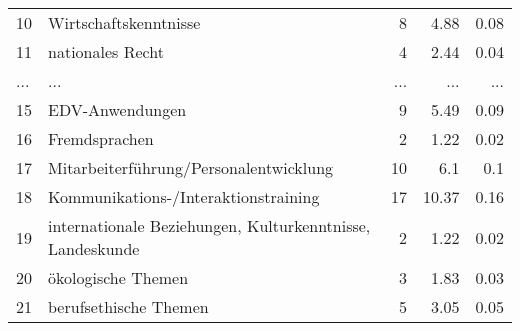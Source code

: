 \begin{longtable}{lXrrr}
        10 & \multicolumn{1}{X}{Wirtschaftskenntnisse} & %
          \num{8} &
          \num[round-mode=places,round-precision=2]{4,88} &
          \num[round-mode=places,round-precision=2]{0,08} \\
        11 & \multicolumn{1}{X}{nationales Recht} & %
          \num{4} &
          \num[round-mode=places,round-precision=2]{2,44} &
          \num[round-mode=places,round-precision=2]{0,04} \\
       ... & ... & ... & ... & ... \\
        15 & \multicolumn{1}{X}{EDV-Anwendungen} & %
          \num{9} &
          \num[round-mode=places,round-precision=2]{5,49} &
          \num[round-mode=places,round-precision=2]{0,09} \\

        16 & \multicolumn{1}{X}{Fremdsprachen} & %
          \num{2} &
          \num[round-mode=places,round-precision=2]{1,22} &
          \num[round-mode=places,round-precision=2]{0,02} \\

        17 & \multicolumn{1}{X}{Mitarbeiterführung/Personalentwicklung} & %
          \num{10} &
          \num[round-mode=places,round-precision=2]{6,1} &
          \num[round-mode=places,round-precision=2]{0,1} \\

        18 & \multicolumn{1}{X}{Kommunikations-/Interaktionstraining} & %
          \num{17} &
          \num[round-mode=places,round-precision=2]{10,37} &
          \num[round-mode=places,round-precision=2]{0,16} \\

        19 & \multicolumn{1}{X}{internationale Beziehungen, Kulturkenntnisse, Landeskunde} & %
          \num{2} &
          \num[round-mode=places,round-precision=2]{1,22} &
          \num[round-mode=places,round-precision=2]{0,02} \\

        20 & \multicolumn{1}{X}{ökologische Themen} & %
          \num{3} &
          \num[round-mode=places,round-precision=2]{1,83} &
          \num[round-mode=places,round-precision=2]{0,03} \\

        21 & \multicolumn{1}{X}{berufsethische Themen} & %
          \num{5} &
          \num[round-mode=places,round-precision=2]{3,05} &
          \num[round-mode=places,round-precision=2]{0,05} \\


\end{longtable}
